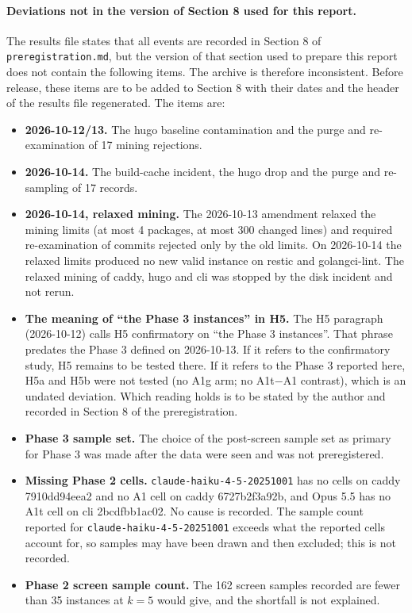 \paragraph{Deviations not in the version of Section 8 used for this report.} The results file states that all events are recorded in Section 8 of \texttt{preregistration.md}, but the version of that section used to prepare this report does not contain the following items. The archive is therefore inconsistent. Before release, these items are to be added to Section 8 with their dates and the header of the results file regenerated. The items are:
\begin{itemize}
\item \textbf{2026-10-12/13.} The hugo baseline contamination and the purge and re-examination of 17 mining rejections.
\item \textbf{2026-10-14.} The build-cache incident, the hugo drop and the purge and re-sampling of 17 records.
\item \textbf{2026-10-14, relaxed mining.} The 2026-10-13 amendment relaxed the mining limits (at most 4 packages, at most 300 changed lines) and required re-examination of commits rejected only by the old limits. On 2026-10-14 the relaxed limits produced no new valid instance on restic and golangci-lint. The relaxed mining of caddy, hugo and cli was stopped by the disk incident and not rerun.
\item \textbf{The meaning of ``the Phase 3 instances'' in H5.} The H5 paragraph (2026-10-12) calls H5 confirmatory on ``the Phase 3 instances''. That phrase predates the Phase 3 defined on 2026-10-13. If it refers to the confirmatory study, H5 remains to be tested there. If it refers to the Phase 3 reported here, H5a and H5b were not tested (no A1g arm; no A1t$-$A1 contrast), which is an undated deviation. Which reading holds is to be stated by the author and recorded in Section 8 of the preregistration.
\item \textbf{Phase 3 sample set.} The choice of the post-screen sample set as primary for Phase 3 was made after the data were seen and was not preregistered.
\item \textbf{Missing Phase 2 cells.} \texttt{claude-haiku-4-5-20251001} has no cells on caddy 7910dd94eea2 and no A1 cell on caddy 6727b2f3a92b, and Opus 5.5 has no A1t cell on cli 2bcdfbb1ac02. No cause is recorded. The sample count reported for \texttt{claude-haiku-4-5-20251001} exceeds what the reported cells account for, so samples may have been drawn and then excluded; this is not recorded.
\item \textbf{Phase 2 screen sample count.} The 162 screen samples recorded are fewer than 35 instances at $k=5$ would give, and the shortfall is not explained.
\end{itemize}

